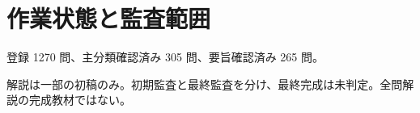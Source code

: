 \chapter{作業状態と監査範囲}
登録 1270 問、主分類確認済み 305 問、要旨確認済み 265 問。
\par 解説は一部の初稿のみ。初期監査と最終監査を分け、最終完成は未判定。全問解説の完成教材ではない。
